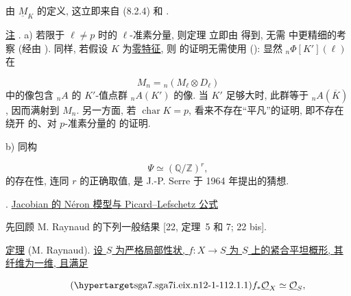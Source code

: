 由 $\underline M_K$ 的定义, 这立即来自 (8.2.4) 和 .

\medskip
\noindent
\underline{注} . a) 若限于 $\ell\neq p$ 时的 $\ell$-准素分量, 则定理  立即由  得到, 无需  中更精细的考察 (经由 ). 同样, 若假设 $K$ 为\underline{零特征}, 则  的证明无需使用 (): 显然 ${}_n\Phi[K'](\ell)$ 在

\begin{equation*}
M_n={}_n(M_\ell\otimes D_\ell)
\end{equation*}
中的像包含 ${}_nA$ 的 $K'$-值点群 ${}_nA(K')$ 的像. 当 $K'$ 足够大时, 此群等于 ${}_nA(\overline K)$, 因而满射到 $M_n$. 另一方面, 若 $\operatorname{char}K=p$, 看来不存在“平凡”的证明, 即不存在绕开  的、对 $p$-准素分量的  的证明.

b) 同构

\begin{equation*}
\Psi\simeq(\mathbb Q/\mathbb Z)^r,
\end{equation*}
的存在性, 连同 $r$ 的正确取值, 是 J.-P. Serre 于 1964 年提出的猜想.


\medskip
{}. \underline{Jacobian 的 Néron 模型与 Picard--Lefschetz 公式}

先回顾 M. Raynaud 的下列一般结果 [22, 定理~5 和 7; 22 bis].

\medskip
\noindent
\underline{定理}  (M. Raynaud). \underline{设 $S$ 为严格局部性状, $f:X\to S$ 为 $S$ 上的紧合平坦概形, 其纤维为一维, 且满足}

\begin{equation}\tag{\SGARefTarget{sga7.sga7i.eix.n12-1-1}{12.1.1}}
 f_*\underline{\mathcal O}_X\simeq\underline{\mathcal O}_S,
\end{equation}

